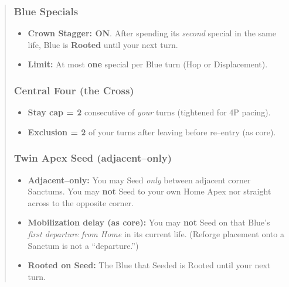 \documentclass[11pt]{article}
\begin{document}
\begin{quote}
\subsubsection*{Blue Specials}
\begin{itemize}[leftmargin=1.3em,itemsep=0.2em]
  \item \textbf{Crown Stagger: ON}. After spending its \emph{second} special in the same life, Blue is \textbf{Rooted} until your next turn.
  \item \textbf{Limit:} At most \textbf{one} special per Blue turn (Hop or Displacement).
\end{itemize}

\subsubsection*{Central Four (the Cross)}
\begin{itemize}[leftmargin=1.3em,itemsep=0.2em]
  \item \textbf{Stay cap = 2} consecutive of \emph{your} turns (tightened for 4P pacing).
  \item \textbf{Exclusion = 2} of your turns after leaving before re--entry (as core).
\end{itemize}

\subsubsection*{Twin Apex Seed (adjacent--only)}
\begin{itemize}[leftmargin=1.3em,itemsep=0.2em]
  \item \textbf{Adjacent--only:} You may Seed \emph{only} between adjacent corner Sanctums. You may \textbf{not} Seed to your own Home Apex nor straight across to the opposite corner.
  \item \textbf{Mobilization delay (as core):} You may \textbf{not} Seed on that Blue's \emph{first departure from Home} in its current life. (Reforge placement onto a Sanctum is not a ``departure.'')
  \item \textbf{Rooted on Seed:} The Blue that Seeded is Rooted until your next turn.
\end{itemize}


\end{quote}
\end{document}
